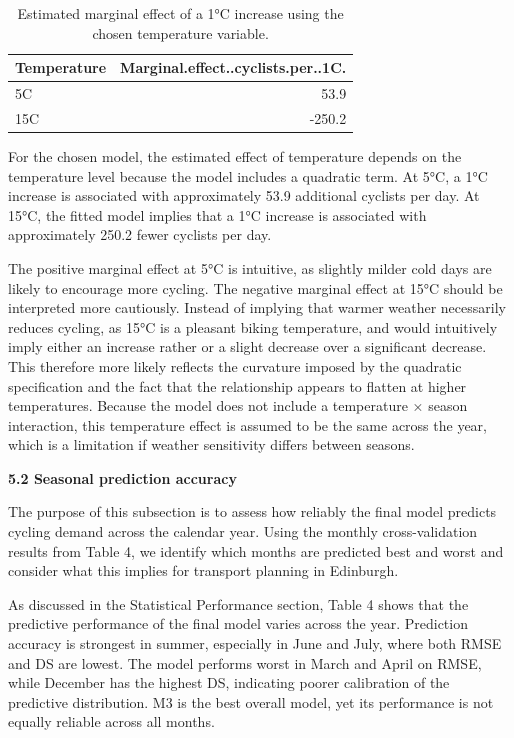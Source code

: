 \documentclass[
]{article}
\begin{document}
\begin{table}[!h]
\centering
\caption{\label{tab:unnamed-chunk-6}Estimated marginal effect of a 1°C increase using the chosen temperature variable.}
\centering
\begin{tabular}[t]{lr}
\toprule
Temperature & Marginal.effect..cyclists.per..1C.\\
\midrule
5C & 53.9\\
15C & -250.2\\
\bottomrule
\end{tabular}
\end{table}

For the chosen model, the estimated effect of temperature depends on the temperature level because the model includes a quadratic term. At 5°C, a 1°C increase is associated with approximately 53.9 additional cyclists per day. At 15°C, the fitted model implies that a 1°C increase is associated with approximately 250.2 fewer cyclists per day.

The positive marginal effect at 5°C is intuitive, as slightly milder cold days are likely to encourage more cycling. The negative marginal effect at 15°C should be interpreted more cautiously. Instead of implying that warmer weather necessarily reduces cycling, as 15°C is a pleasant biking temperature, and would intuitively imply either an increase rather or a slight decrease over a significant decrease. This therefore more likely reflects the curvature imposed by the quadratic specification and the fact that the relationship appears to flatten at higher temperatures. Because the model does not include a temperature × season interaction, this temperature effect is assumed to be the same across the year, which is a limitation if weather sensitivity differs between seasons.

\textbf{5.2 Seasonal prediction accuracy}

The purpose of this subsection is to assess how reliably the final model predicts cycling demand across the calendar year. Using the monthly cross-validation results from Table 4, we identify which months are predicted best and worst and consider what this implies for transport planning in Edinburgh.

As discussed in the Statistical Performance section, Table 4 shows that the predictive performance of the final model varies across the year. Prediction accuracy is strongest in summer, especially in June and July, where both RMSE and DS are lowest. The model performs worst in March and April on RMSE, while December has the highest DS, indicating poorer calibration of the predictive distribution. M3 is the best overall model, yet its performance is not equally reliable across all months.
\end{document}
